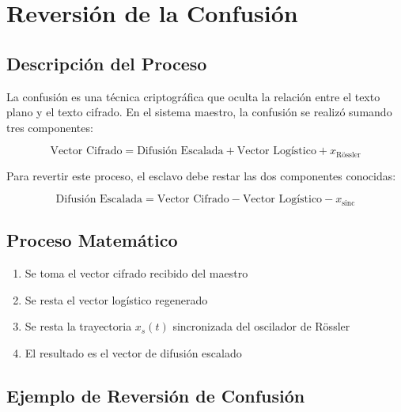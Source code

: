 \documentclass[12pt,a4paper]{article}
\begin{document}
	\section{Reversión de la Confusión}
	
	\subsection{Descripción del Proceso}
	
	La confusión es una técnica criptográfica que oculta la relación entre el texto plano y el texto cifrado. En el sistema maestro, la confusión se realizó sumando tres componentes:
	
	$$\text{Vector Cifrado} = \text{Difusión Escalada} + \text{Vector Logístico} + x_{\text{Rössler}}$$
	
	Para revertir este proceso, el esclavo debe restar las dos componentes conocidas:
	
	$$\text{Difusión Escalada} = \text{Vector Cifrado} - \text{Vector Logístico} - x_{\text{sinc}}$$
	
	\subsection{Proceso Matemático}
	
	\begin{enumerate}
		\item Se toma el vector cifrado recibido del maestro
		\item Se resta el vector logístico regenerado
		\item Se resta la trayectoria $x_s(t)$ sincronizada del oscilador de Rössler
		\item El resultado es el vector de difusión escalado
	\end{enumerate}
	
	\subsection{Ejemplo de Reversión de Confusión}
	
\end{document}
